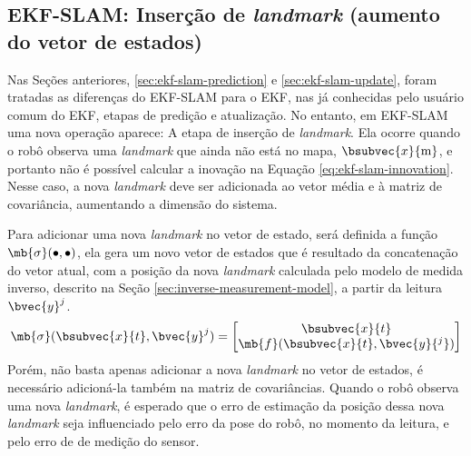 \subsection{EKF-SLAM: Inserção de \textit{landmark} (aumento do vetor de estados)}
\label{sec:ekf-slam-landmark-insertion}
Nas Seções anteriores, \ref{sec:ekf-slam-prediction} e \ref{sec:ekf-slam-update}, foram tratadas as diferenças 
do EKF-SLAM para o EKF, nas já conhecidas pelo usuário comum do EKF, etapas de predição e atualização. No entanto, em EKF-SLAM uma nova operação aparece: A etapa de inserção de \textit{landmark}. Ela ocorre quando o robô observa uma \textit{landmark} que ainda não está no mapa, $\bsubvec{x}{\mathrm{m}}$, e portanto não é possível calcular a inovação na Equação \ref{eq:ekf-slam-innovation}. Nesse caso, a nova \textit{landmark} deve ser adicionada ao vetor média e à matriz de covariância, aumentando a dimensão do sistema.

Para adicionar uma nova \textit{landmark} no vetor de estado, será definida 
a função $\mb{\sigma}(\bullet, \bullet)$, ela gera um novo vetor de estados 
que é resultado da concatenação do vetor atual, com a posição da nova 
\textit{landmark} calculada pelo modelo de medida inverso, descrito na Seção \ref{sec:inverse-measurement-model}, a partir da leitura $\bvec{y}^j$.
\begin{equation}
      \mb{\sigma}(\bsubvec{x}{t}, \bvec{y}^j) = \begin{bmatrix}
        \bsubvec{x}{t} \\
        \mb{f}(\bsubvec{x}{t}, \bvec{y}{^j})
      \end{bmatrix}
\end{equation}
Porém, não basta apenas adicionar a nova \textit{landmark} no vetor de estados, é necessário adicioná-la também na matriz de covariâncias. Quando 
o robô observa uma nova \textit{landmark}, é esperado que o erro de estimação 
da posição dessa nova \textit{landmark} seja influenciado pelo erro da 
pose do robô, no momento da leitura, e pelo erro de de medição do sensor. 

